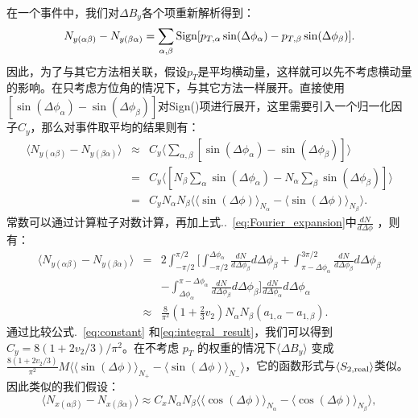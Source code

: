 在一个事件中，我们对$\Delta B_y$各个项重新解析得到：
\begin{equation}
N_{y(\alpha\beta)}-N_{y(\beta\alpha)} = \sum_{\alpha,\beta} {\rm Sign}[p_{T,\alpha}\sin(\Delta\phi_\alpha)-p_{T,\beta}\sin(\Delta\phi_\beta)].    
\end{equation}
因此，为了与其它方法相关联，假设$p_T$是平均横动量，这样就可以先不考虑横动量的影响。在只考虑方位角的情况下，与其它方法一样展开。直接使用$[\sin(\Delta\phi_\alpha) - \sin(\Delta\phi_\beta)]$对Sign()项进行展开，这里需要引入一个归一化因子$C_y$，那么对事件取平均的结果则有：
\begin{eqnarray}
\langle N_{y(\alpha\beta)}-N_{y(\beta\alpha)} \rangle &\approx& C_y \Big\langle \sum_{\alpha,\beta} [\sin(\Delta\phi_\alpha) - \sin(\Delta\phi_\beta)] \Big\rangle \nonumber \\
&=& C_y \Big\langle [N_\beta \sum_{\alpha}\sin(\Delta\phi_\alpha) - N_\alpha \sum_{\beta}\sin(\Delta\phi_\beta)] \Big\rangle \nonumber \\
&=& C_y N_\alpha N_\beta \langle \langle \sin(\Delta \phi)\rangle _{N_\alpha}-\langle \sin(\Delta\phi)\rangle_{N_\beta} \rangle. \label{eq:constant}
\end{eqnarray}
常数可以通过计算粒子对数计算，再加上式..~\ref{eq:Fourier_expansion}中$\frac{dN}{d\Delta\phi}$ ，则有：
\begin{eqnarray}
\langle N_{y(\alpha\beta)}-N_{y(\beta\alpha)} \rangle &=& 2\int_{-\pi/2}^{\pi/2} 
\Big[\int_{-\pi/2}^{\Delta\phi_\alpha} \frac{dN}{d\Delta\phi_\beta}d\Delta\phi_\beta+\int_{\pi-\Delta\phi_\alpha}^{3\pi/2} \frac{dN}{d\Delta\phi_\beta}d\Delta\phi_\beta   \nonumber \\
&& -\int^{\pi-\Delta\phi_\alpha}_{\Delta\phi_\alpha} \frac{dN}{d\Delta\phi_\beta}d\Delta\phi_\beta\Big]\frac{dN}{d\Delta\phi_\alpha}d\Delta\phi_\alpha \nonumber \\
&\approx& \frac{8}{\pi^2}(1+\frac{2}{3}v_2)N_\alpha N_\beta (a_{1,\alpha}-a_{1,\beta}).  \label{eq:integral_result}  
\end{eqnarray}
通过比较公式.~\ref{eq:constant} 和\ref{eq:integral_result}，我们可以得到$C_y = 8(1+2v_2/3)/\pi^2$。在不考虑 $p_T$ 的权重的情况下$\langle\Delta B_y\rangle$ 变成$\frac{8(1+2v_2/3)}{\pi^2} M \langle\langle \sin(\Delta \phi)\rangle_{N_+} -\langle \sin(\Delta\phi)\rangle_{N_-} \rangle$，它的函数形式与$\langle S_{2,\rm real}\rangle$类似。
因此类似的我们假设：
\begin{equation}
\langle N_{x(\alpha\beta)}-N_{x(\beta\alpha)} \rangle \approx  C_x N_\alpha N_\beta \langle\langle \cos(\Delta \phi)\rangle _{N_\alpha}-\langle \cos(\Delta\phi)\rangle_{N_\beta} \rangle,  
\end{equation}
